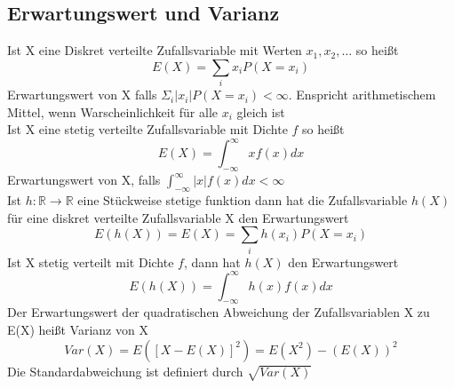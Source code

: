 \documentclass[
	ngerman,
	accentcolor=9c,%
	type=intern,
	marginpar=false
	]{tudapub}
\begin{document}
        \subsection{Erwartungswert und Varianz}
            Ist X eine Diskret verteilte Zufallsvariable mit Werten $x_1, x_2, \dots$ so heißt
            \begin{equation*}
                E(X) = \sum_i x_i P(X=x_i)
            \end{equation*}
            Erwartungswert von X falls $\Sigma_i |x_i| P(X=x_i) < \infty$. Enspricht arithmetischem Mittel, wenn Warscheinlichkeit für alle $x_i$ gleich ist\\
            Ist X eine stetig verteilte Zufallsvariable mit Dichte $f$ so heißt
            \begin{equation*}
                E(X) = \int_{-\infty}^\infty x f(x) dx 
            \end{equation*}
            Erwartungswert von X, falls $\int_{-\infty}^\infty |x| f(x) dx < \infty$\\
            Ist $h: \mathbb{R} \rightarrow \mathbb{R}$ eine Stückweise stetige funktion dann hat die Zufallsvariable $h(X)$
            für eine diskret verteilte Zufallsvariable X den Erwartungswert
            \begin{equation*}
                E(h(X)) = E(X) = \sum_i h(x_i) P(X=x_i)
            \end{equation*}
            Ist X stetig verteilt mit Dichte $f$, dann hat $h(X)$ den Erwartungswert
            \begin{equation*}
                E(h(X)) = \int_{-\infty}^\infty h(x) f(x) dx 
            \end{equation*}
            Der Erwartungswert  der quadratischen Abweichung der Zufallsvariablen X zu E(X) heißt Varianz von X
            \begin{equation*}
                Var(X) = E([X- E(X)]^2) = E(X^2) - (E(X))^2
            \end{equation*}
            Die Standardabweichung ist definiert durch $\sqrt{Var(X)}$
\end{document}
